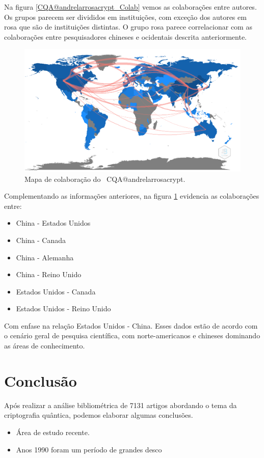 Na figura \ref{CQA@andrelarrosacrypt_Colab} vemos as colaborações entre autores. Os grupos parecem ser divididos em instituições, com exceção dos autores em rosa que são de instituições distintas. O grupo rosa parece correlacionar com as colaborações entre pesquisadores chineses e ocidentais descrita anteriormente.

\begin{figure}
    \centering
    \includegraphics[angle=0,width=1\textwidth]{experiments/andrelarrosacrypt/AnaliseBibliometrica/CriptografiaQuantica/imagens/CQA@andrelarrosacrypt_ColabMap.png}
    \caption{Mapa de colaboração do \dataset\ CQA@andrelarrosacrypt.}
    \label{CQA@andrelarrosacrypt_ColabMap}
\end{figure}

Complementando as informações anteriores, na figura \ref{CQA@andrelarrosacrypt_ColabMap} evidencia as colaborações entre:

\begin{itemize}
    \item China - Estados Unidos
    \item China - Canada
    \item China - Alemanha
    \item China - Reino Unido
    \item Estados Unidos - Canada
    \item Estados Unidos - Reino Unido
\end{itemize}

Com enfase na relação Estados Unidos - China. Esses dados estão de acordo com o cenário geral de pesquisa científica, com norte-americanos e chineses dominando as áreas de conhecimento.

\section{Conclusão}

Após realizar a análise bibliométrica de 7131 artigos abordando o tema da criptografia quântica, podemos elaborar algumas conclusões.

\begin{itemize}
    \item Área de estudo recente.
    \item Anos 1990 foram um período de grandes desco
\end{itemize}
